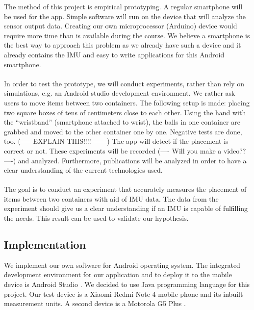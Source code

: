 \documentclass[12pt,twoside, hidelinks]{article}
\begin{document}
The method of this project is empirical prototyping. A regular smartphone will be used for the app. Simple software will run on the device that will analyze the sensor output data. Creating our own microprocessor (Arduino) device would require more time than is available during the course. We believe a smartphone is the best way to approach this problem as we already have such a device and it already contains the IMU and easy to write applications for this Android smartphone.
\\
\\
In order to test the prototype, we will conduct experiments, rather than rely on simulations, e.g. an Android studio development environment. We rather ask users to move items between two containers. The following setup is made: placing two square boxes of tens of centimeters close to each other. Using the hand with the “wristband” (smartphone attached to wrist), the balls in one container are grabbed and moved to the other container one by one. Negative tests are done, too. (----- EXPLAIN THIS!!!! ------) The app will detect if the placement is correct or not. These experiments will be recorded (---- Will you make a video?? ----) and analyzed.
Furthermore, publications will be analyzed in order to have a clear understanding of the current technologies used.
\\
\\
The goal is to conduct an experiment that accurately measures the placement of items between two containers with aid of IMU data. The data from the experiment should give us a clear understanding if an IMU is capable of fulfilling the needs. This result can be used to validate our hypothesis.



\subsection{Implementation}
\label{sect:implementation}
We implement our own software for Android operating system\cite{Android}. The integrated development environment for our application and to deploy it to the mobile device is Android Studio \cite{Android_Studio} . We decided to use Java programming language \cite{Java} for this project. Our test device is a Xiaomi Redmi Note 4 mobile phone \cite{Redmi_Note4} and its inbuilt measurement units. A second device is a Motorola G5 Plus \cite{motoG5}.
\end{document}

